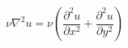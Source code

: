 \documentclass[preview,border=2pt]{standalone}
\begin{document}
\[
\nu\nabla^{2}u = \nu\left(\frac{\partial^{2}u}{\partial x^{2}}+\frac{\partial^{2}u}{\partial y^{2}}\right)
\]
\end{document}
